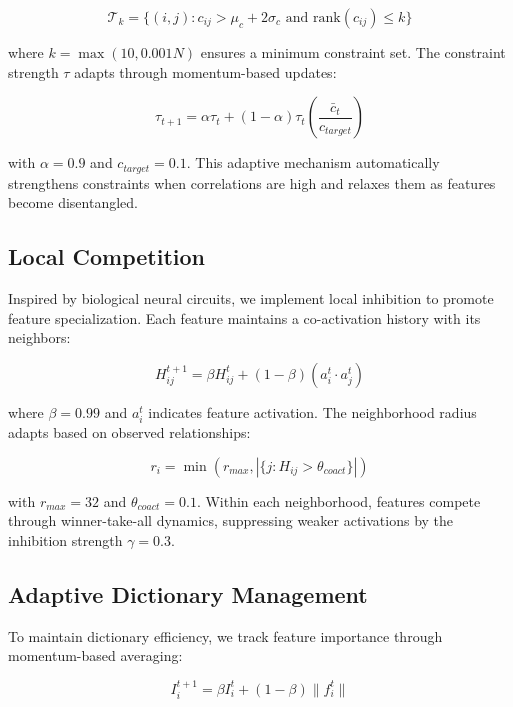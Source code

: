 \documentclass{article} %
\begin{document}
\begin{equation}
    \mathcal{T}_k = \{(i,j) : c_{ij} > \mu_c + 2\sigma_c \text{ and } \text{rank}(c_{ij}) \leq k\}
\end{equation}

where $k = \max(10, 0.001N)$ ensures a minimum constraint set. The constraint strength $\tau$ adapts through momentum-based updates:

\begin{equation}
    \tau_{t+1} = \alpha\tau_t + (1-\alpha)\tau_t\left(\frac{\bar{c}_t}{c_{target}}\right)
\end{equation}

with $\alpha=0.9$ and $c_{target}=0.1$. This adaptive mechanism automatically strengthens constraints when correlations are high and relaxes them as features become disentangled.

\subsection{Local Competition}
Inspired by biological neural circuits, we implement local inhibition to promote feature specialization. Each feature maintains a co-activation history with its neighbors:

\begin{equation}
    H_{ij}^{t+1} = \beta H_{ij}^t + (1-\beta)(a_i^t \cdot a_j^t)
\end{equation}

where $\beta=0.99$ and $a_i^t$ indicates feature activation. The neighborhood radius adapts based on observed relationships:

\begin{equation}
    r_i = \min(r_{max}, |\{j : H_{ij} > \theta_{coact}\}|)
\end{equation}

with $r_{max}=32$ and $\theta_{coact}=0.1$. Within each neighborhood, features compete through winner-take-all dynamics, suppressing weaker activations by the inhibition strength $\gamma=0.3$.

\subsection{Adaptive Dictionary Management}
To maintain dictionary efficiency, we track feature importance through momentum-based averaging:

\begin{equation}
    I_i^{t+1} = \beta I_i^t + (1-\beta)\|f_i^t\|
\end{equation}
\end{document}

